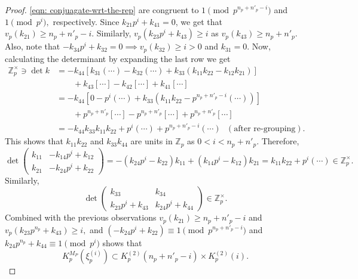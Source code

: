 \documentclass[11pt]{amsart}
\newcommand{\congp}[1]{K_p^{(2)}(#1)}
\begin{document}
\begin{proof}
\eqref{eqn: conjuagate-wrt-the-rep} are congruent to $1 \pmod{p^{n_p + n'_p-i}}$ and $1 \pmod{p^{i}},$ respectively.
Since $k_{21}p^{i} + k_{41} = 0$, we get that $v_p(k_{21}) \geq n_p + n'_p - i$. 
Similarly, $v_p(k_{23}p^{i} + k_{43}) \geq i$ as $v_p(k_{43}) \geq n_p + n'_p.$ 
Also, note that $-k_{34}p^{i} + k_{32}=0 \implies v_p(k_{32}) \geq i> 0$ and $k_{31} = 0.$ Now, calculating the determinant by expanding the last row we get 
	\begin{align*}
		\mathbb{Z}_p^\times \ni \det{k} & = -k_{44}[ k_{31}(\cdots) - k_{32}(\cdots) + k_{33}( k_{11} k_{22} - k_{12}k_{21})] \\
		&\qquad + k_{43}[\cdots] -k_{42}[\cdots] + k_{41}[\cdots]\\
		&= -k_{44}[0 - p^{i} (\cdots) + k_{33}(k_{11}k_{22} - p^{n_p + n'_p - i}(\cdots))] \\&\qquad + p^{n_p + n'_p}[\cdots] - p^{n_p + n'_p}[\cdots] + p^{n_p + n'_p}[\cdots]\\
		&= -k_{44}k_{33}k_{11}k_{22} + p^{i}(\cdots) + p^{n_p + n'_p -i}(\cdots)  \:\:\: (\text{after re-grouping}).
	\end{align*}
	This shows that $k_{11}k_{22}$ and $k_{33}k_{44}$ are units in $\mathbb{Z}_p$ as $ 0 < i < n_p + n'_p.$ Therefore,
$$%
\det{\left(\begin{array}{rr}
				k_{11} & -k_{14} p^{i} + k_{12} \\
				k_{21} & -k_{24} p^{i} + k_{22}
			\end{array}\right)}  
= -{\left(k_{24} p^{i} - k_{22}\right)} k_{11} + {\left(k_{14}p^{i} - k_{12}\right)} k_{21} 
= k_{11}k_{22} + p^{i} (\cdots) \in \mathbb{Z}_p^\times.
$$%
Similarly,
$$
\det \left(\begin{array}{rr}
		k_{33} & k_{34} \\
		k_{23} p^{i} + k_{43} & k_{24} p^{i} + k_{44}
	\end{array}\right) \in \mathbb{Z}_p^\times .
$$
Combined with the previous observations $v_p(k_{21}) \geq n_p + n'_p -i$ and $v_p(k_{23}p^{n_p} + k_{43}) \geq i,$ and $(-k_{24}p^i + k_{22}) \equiv 1 \pmod{p^{n_p + n'_p - i}}$ and  $k_{24}p^{n_p} + k_{44} \equiv 1 \pmod{p^i}$ shows that 
	\[ K_p^{M_P}(\xi_p^{(i)}) \subset \congp{n_p + n'_p - i}\times \congp{i}.\]


\end{proof}
\end{document}
